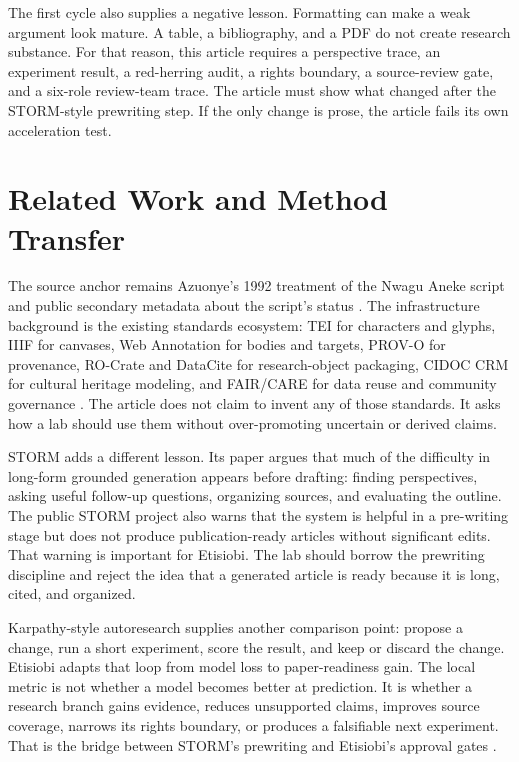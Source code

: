 \documentclass[sigconf,nonacm]{acmart}
\begin{document}
The first cycle also supplies a negative lesson. Formatting can make a weak
argument look mature. A table, a bibliography, and a PDF do not create research
substance. For that reason, this article requires a perspective trace, an
experiment result, a red-herring audit, a rights boundary, a source-review gate,
and a six-role review-team trace. The article must show what changed after the
STORM-style prewriting step. If the only change is prose, the article fails its
own acceleration test.

\section{Related Work and Method Transfer}
The source anchor remains Azuonye's 1992 treatment of the Nwagu Aneke script and
public secondary metadata about the script's status \cite{azuonye1992,omniglotNwagu,scriptSourceNwagu,unicodeAfricanScripts2023}.
The infrastructure background is the existing standards ecosystem: TEI for
characters and glyphs, IIIF for canvases, Web Annotation for bodies and targets,
PROV-O for provenance, RO-Crate and DataCite for research-object packaging,
CIDOC CRM for cultural heritage modeling, and FAIR/CARE for data reuse and
community governance \cite{teiP5Glyphs,iiifPresentation3,w3cAnnotationModel,w3cProvO,rocrate12,cidocCrm,datacite45,wilkinson2016fair,carroll2020care}. The article does not claim to invent
any of those standards. It asks how a lab should use them without over-promoting
uncertain or derived claims.

STORM adds a different lesson. Its paper argues that much of the difficulty in
long-form grounded generation appears before drafting: finding perspectives,
asking useful follow-up questions, organizing sources, and evaluating the
outline. The public STORM project also warns that the system is helpful in a
pre-writing stage but does not produce publication-ready articles without
significant edits. That warning is important for Etisiobi. The lab should borrow
the prewriting discipline and reject the idea that a generated article is ready
because it is long, cited, and organized.

Karpathy-style autoresearch supplies another comparison point: propose a change,
run a short experiment, score the result, and keep or discard the change. Etisiobi
adapts that loop from model loss to paper-readiness gain. The local metric is
not whether a model becomes better at prediction. It is whether a research
branch gains evidence, reduces unsupported claims, improves source coverage,
narrows its rights boundary, or produces a falsifiable next experiment. That is
the bridge between STORM's prewriting and Etisiobi's approval gates
\cite{karpathyAutoresearch,shao2024storm,jiang2024costorm}.
\end{document}

